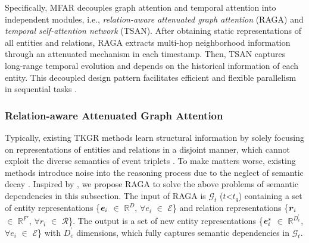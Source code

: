 \documentclass[sigconf,natbib=true]{acmart}
\begin{document}
Specifically, MFAR decouples graph attention and temporal attention into independent modules, i.e., \emph{relation-aware attenuated graph attention} (RAGA) and \emph{temporal self-attention network} (TSAN). After obtaining static representations of all entities and relations, RAGA extracts multi-hop neighborhood information through an attenuated mechanism in each timestamp. Then, TSAN captures long-range temporal evolution and depends on the historical information of each entity. This decoupled design pattern facilitates efficient  and flexible parallelism in  sequential tasks \cite{decouple}. 

\subsubsection{Relation-aware Attenuated Graph Attention}

Typically, existing TKGR methods \cite{TiTer, Cluster, RE-GCN, TiRGN, CEN, HiSMatch} learn structural information by solely focusing on representations of entities and relations in a disjoint manner, which cannot exploit the diverse semantics of event triplets \cite{TKG-survey-bai}. To make matters worse, existing methods introduce noise into the reasoning process due to the neglect of semantic decay \cite{MultiHop}. Inspired by \cite{NathaniCSK19}, we propose RAGA to solve the above problems of semantic dependencies in this subsection.  The input of RAGA is  $\mathcal{G}_t$ ($t$<$t_q$) containing a set of entity representations \{$\textbf{\emph{e}}_i$ $\in$ $\mathbb{R}^{D}$, ${\forall}$$e_i$ $\in$ $\mathcal{E}$\} and relation representations \{$\textbf{\emph{r}}_i$ $\in$ $\mathbb{R}^{F'}$, ${\forall}$$r_i$ $\in$ $\mathcal{R}$\}. The output is a set of new entity representations   \{$\textbf{\emph{e}}_i^{s}$ $\in$ $\mathbb{R}^{D_e^{'}}$, ${\forall}$$e_i$ $\in$ $\mathcal{E}$\} with $D_e^{'}$ dimensions, which fully captures semantic dependencies in  $\mathcal{G}_t$. 
 
\end{document}
